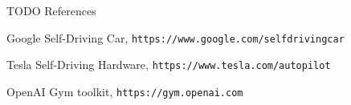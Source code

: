 \documentclass[a4paper]{article}
\begin{document}
TODO References\\


\begin{thebibliography}{9}
  Google Self-Driving Car, \texttt{https://www.google.com/selfdrivingcar}

  Tesla Self-Driving Hardware, \texttt{https://www.tesla.com/autopilot}

  OpenAI Gym toolkit, \texttt{https://gym.openai.com}

\end{thebibliography}
\end{document}
